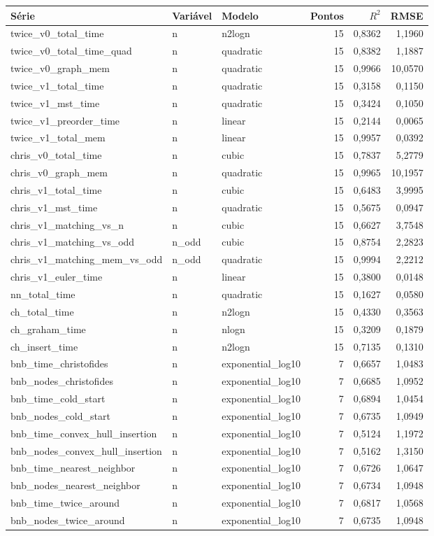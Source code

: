 \begin{tabular}{lllrrr}
\toprule
Série & Variável & Modelo & Pontos & $R^2$ & RMSE \\
\midrule
twice\_v0\_total\_time & n & n2logn & 15 & 0,8362 & 1,1960 \\
twice\_v0\_total\_time\_quad & n & quadratic & 15 & 0,8382 & 1,1887 \\
twice\_v0\_graph\_mem & n & quadratic & 15 & 0,9966 & 10,0570 \\
twice\_v1\_total\_time & n & quadratic & 15 & 0,3158 & 0,1150 \\
twice\_v1\_mst\_time & n & quadratic & 15 & 0,3424 & 0,1050 \\
twice\_v1\_preorder\_time & n & linear & 15 & 0,2144 & 0,0065 \\
twice\_v1\_total\_mem & n & linear & 15 & 0,9957 & 0,0392 \\
chris\_v0\_total\_time & n & cubic & 15 & 0,7837 & 5,2779 \\
chris\_v0\_graph\_mem & n & quadratic & 15 & 0,9965 & 10,1957 \\
chris\_v1\_total\_time & n & cubic & 15 & 0,6483 & 3,9995 \\
chris\_v1\_mst\_time & n & quadratic & 15 & 0,5675 & 0,0947 \\
chris\_v1\_matching\_vs\_n & n & cubic & 15 & 0,6627 & 3,7548 \\
chris\_v1\_matching\_vs\_odd & n\_odd & cubic & 15 & 0,8754 & 2,2823 \\
chris\_v1\_matching\_mem\_vs\_odd & n\_odd & quadratic & 15 & 0,9994 & 2,2212 \\
chris\_v1\_euler\_time & n & linear & 15 & 0,3800 & 0,0148 \\
nn\_total\_time & n & quadratic & 15 & 0,1627 & 0,0580 \\
ch\_total\_time & n & n2logn & 15 & 0,4330 & 0,3563 \\
ch\_graham\_time & n & nlogn & 15 & 0,3209 & 0,1879 \\
ch\_insert\_time & n & n2logn & 15 & 0,7135 & 0,1310 \\
bnb\_time\_christofides & n & exponential\_log10 & 7 & 0,6657 & 1,0483 \\
bnb\_nodes\_christofides & n & exponential\_log10 & 7 & 0,6685 & 1,0952 \\
bnb\_time\_cold\_start & n & exponential\_log10 & 7 & 0,6894 & 1,0454 \\
bnb\_nodes\_cold\_start & n & exponential\_log10 & 7 & 0,6735 & 1,0949 \\
bnb\_time\_convex\_hull\_insertion & n & exponential\_log10 & 7 & 0,5124 & 1,1972 \\
bnb\_nodes\_convex\_hull\_insertion & n & exponential\_log10 & 7 & 0,5162 & 1,3150 \\
bnb\_time\_nearest\_neighbor & n & exponential\_log10 & 7 & 0,6726 & 1,0647 \\
bnb\_nodes\_nearest\_neighbor & n & exponential\_log10 & 7 & 0,6734 & 1,0948 \\
bnb\_time\_twice\_around & n & exponential\_log10 & 7 & 0,6817 & 1,0568 \\
bnb\_nodes\_twice\_around & n & exponential\_log10 & 7 & 0,6735 & 1,0948 \\
\bottomrule
\end{tabular}
